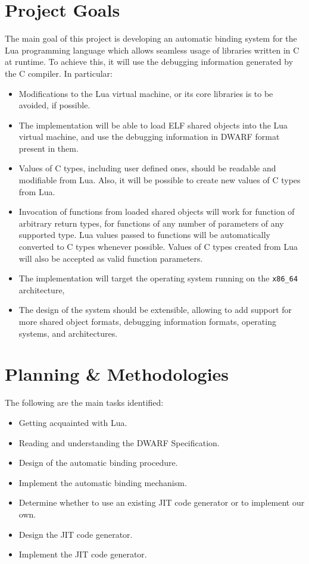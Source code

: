 \section{Project Goals}

The main goal of this project is developing an automatic binding system for
the Lua programming language which allows seamless usage of libraries written
in C at runtime. To achieve this, it will use the debugging information
generated by the C compiler. In particular:

\begin{itemize}
	\item Modifications to the Lua virtual machine, or its core libraries is
		to be avoided, if possible.
	\item The implementation will be able to load \gls{ELF} shared objects
		into the Lua virtual machine, and use the debugging information in
		\gls{DWARF} format present in them.
	\item Values of C types, including user defined ones, should be readable
		and modifiable from Lua. Also, it will be possible to create new
		values of C types from Lua.
	\item Invocation of functions from loaded shared objects will work for
		function of arbitrary return types, for functions of any number of
		parameters of any supported type. Lua values passed to functions
		will be automatically converted to C types whenever possible. Values
		of C types created from Lua will also be accepted as valid function
		parameters.
	\item The implementation will target the \GnuLinux* operating system
		running on the \texttt{x86\_64} architecture,
	\item The design of the system should be extensible, allowing to add
		support for more shared object formats, debugging information formats,
		operating systems, and architectures.
\end{itemize}


\section{Planning \& Methodologies}

The following are the main tasks identified:

\begin{itemize}
	\item Getting acquainted with Lua.
	\item Reading and understanding the \gls{DWARF} Specification.
	\item Design of the automatic binding procedure.
	\item Implement the automatic binding mechanism.
	\item Determine whether to use an existing JIT code generator or to
		implement our own.
	\item Design the JIT code generator.
	\item Implement the JIT code generator.
\end{itemize}
